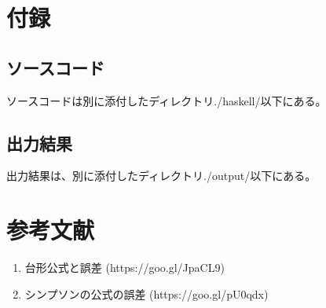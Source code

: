 \documentclass[11pt]{jsarticle}
\begin{document}
\section{付録}
\subsection{ソースコード}
ソースコードは別に添付したディレクトリ./haskell/以下にある。

\subsection{出力結果}
出力結果は、別に添付したディレクトリ./output/以下にある。

\section{参考文献}
\begin{enumerate}
    \item 台形公式と誤差 (https://goo.gl/JpaCL9)
    \item シンプソンの公式の誤差 (https://goo.gl/pU0qdx)
\end{enumerate}
\end{document}

